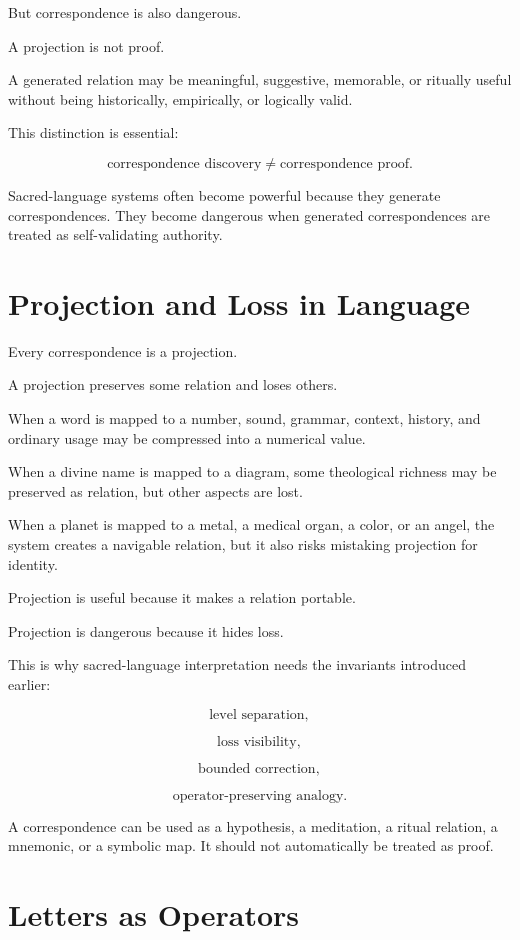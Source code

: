 \documentclass[11pt]{book}
\begin{document}
But correspondence is also dangerous.

A projection is not proof.

A generated relation may be meaningful, suggestive, memorable, or ritually useful without being historically, empirically, or logically valid.

This distinction is essential:

\[
\text{correspondence discovery} \neq \text{correspondence proof}.
\]

Sacred-language systems often become powerful because they generate correspondences. They become dangerous when generated correspondences are treated as self-validating authority.

\section{Projection and Loss in Language}

Every correspondence is a projection.

A projection preserves some relation and loses others.

When a word is mapped to a number, sound, grammar, context, history, and ordinary usage may be compressed into a numerical value.

When a divine name is mapped to a diagram, some theological richness may be preserved as relation, but other aspects are lost.

When a planet is mapped to a metal, a medical organ, a color, or an angel, the system creates a navigable relation, but it also risks mistaking projection for identity.

Projection is useful because it makes a relation portable.

Projection is dangerous because it hides loss.

This is why sacred-language interpretation needs the invariants introduced earlier:

\[
\text{level separation},
\]

\[
\text{loss visibility},
\]

\[
\text{bounded correction},
\]

\[
\text{operator-preserving analogy}.
\]

A correspondence can be used as a hypothesis, a meditation, a ritual relation, a mnemonic, or a symbolic map. It should not automatically be treated as proof.

\section{Letters as Operators}
\end{document}
